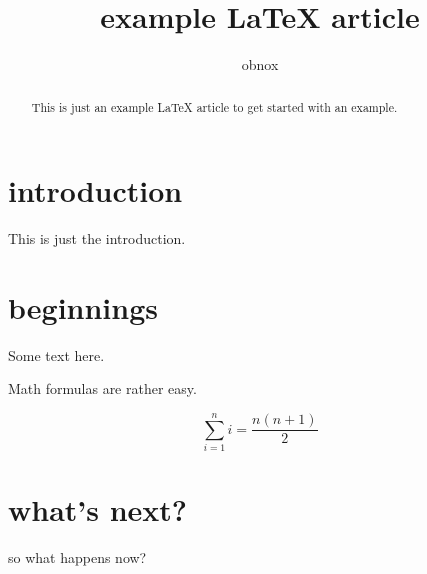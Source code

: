 \documentclass{article}
\title{example {\LaTeX} article}
\author{obnox}
\begin{document}
\maketitle
\begin{abstract}

    This is just an example {\LaTeX} article to get started
    with an example.

\end{abstract}

\tableofcontents


\section{introduction}

This is just the introduction.

\section{beginnings}



Some text here.

Math formulas are rather easy.


\[ \sum_{i=1}^{n}i = \frac{n(n+1)}{2} \]

\section{what's next?}

so what happens now?
\end{document}
